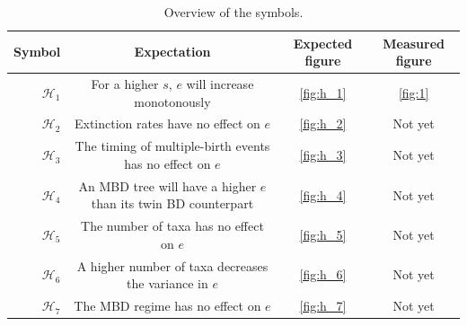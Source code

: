 \documentclass{article}
\begin{document}
\begin{table}
  \centering 
  \begin{tabular}{r c c c}
    \hline
    Symbol                & Expectation & Expected figure & Measured figure \\
    \hline
    \hline
    $\mathcal{H}_1$       & For a higher $s$, $e$ will increase monotonously & \ref{fig:h_1} & \ref{fig:1} \\
    $\mathcal{H}_2$       & Extinction rates have no effect on $e$ & \ref{fig:h_2} & Not yet \\
    $\mathcal{H}_3$       & The timing of multiple-birth events has no effect on $e$ & \ref{fig:h_3} & Not yet \\
    $\mathcal{H}_4$       & An MBD tree will have a higher $e$ than its twin BD counterpart & \ref{fig:h_4} & Not yet \\
    $\mathcal{H}_5$       & The number of taxa has no effect on $e$ & \ref{fig:h_5} & Not yet \\
    $\mathcal{H}_6$       & A higher number of taxa decreases the variance in $e$ & \ref{fig:h_6} & Not yet \\
    $\mathcal{H}_7$       & The MBD regime has no effect on $e$ & \ref{fig:h_7} & Not yet \\
    \hline
  \end{tabular}
  \caption{
    Overview of the symbols. 
  }
  \label{table:hypotheses}
\end{table}
\end{document}
